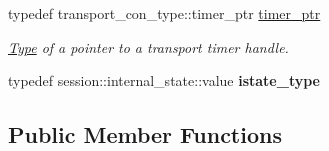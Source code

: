 \begin{DoxyCompactItemize}
typedef transport\+\_\+con\+\_\+type\+::timer\+\_\+ptr \mbox{\hyperlink{classwebsocketpp_1_1connection_aa13510ba1841ded8492a0483a294feb0}{timer\+\_\+ptr}}
\begin{DoxyCompactList}\small\item\em \mbox{\hyperlink{struct_type}{Type}} of a pointer to a transport timer handle. \end{DoxyCompactList}\item 
\mbox{\label{classwebsocketpp_1_1connection_ab22544fdc49d7f332cd1abba9fefd814}} 
typedef session\+::internal\+\_\+state\+::value {\bfseries istate\+\_\+type}
\end{DoxyCompactItemize}
\subsection*{Public Member Functions}
